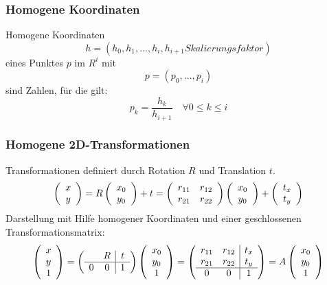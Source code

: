 \subsubsection*{Homogene Koordinaten}

Homogene Koordinaten $$h = (h_0,h_1, \dots, h_i, h_{i+1} \textit{Skalierungsfaktor})$$ eines Punktes $p$ im $R^i$ mit $$p = (p_0,\dots,p_i)$$ sind Zahlen, für die gilt: $$p_k = \frac{h_k}{h_{i+1}} \quad \forall 0 \leq k \leq i$$

\subsubsection*{Homogene 2D-Transformationen}

Transformationen definiert durch Rotation $R$ und Translation $t$.
$$\left( \begin{array}{c} x \\ y \end{array} \right) = R \left( \begin{array}{c} x_0 \\ y_0 \end{array} \right) + t = \left( \begin{array}{cc} r_{11} & r_{12} \\ r_{21} & r_{22} \end{array} \right) \left( \begin{array}{c} x_0 \\ y_0 \end{array} \right) + \left( \begin{array}{c} t_x \\ t_y \end{array} \right)$$
Darstellung mit Hilfe homogener Koordinaten und einer geschlossenen Transformationsmatrix:
$$\left( \begin{array}{c} x \\ y \\ 1 \end{array} \right) = \left( \begin{array}{cc|c} & R & t \\ \hline 0 & 0 & 1 \end{array} \right) \left( \begin{array}{c} x_0 \\ y_0 \\ 1 \end{array} \right) = \left( \begin{array}{cc|c} r_{11} & r_{12} & t_x \\ r_{21} & r_{22} & t_y \\ \hline 0 & 0 & 1 \end{array} \right) = A \left( \begin{array}{c} x_0 \\ y_0 \\ 1 \end{array} \right)$$